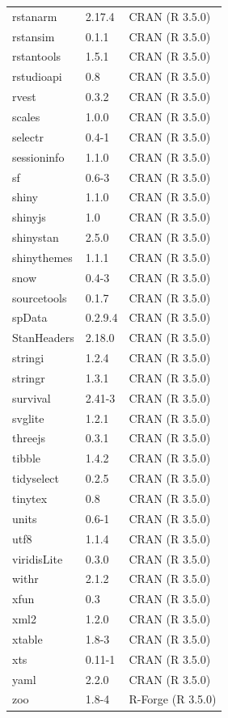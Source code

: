 \documentclass[12pt,a4paper,UTF8,twoside]{book}
\theoremstyle{definition}
\theoremstyle{definition}
\theoremstyle{definition}
\theoremstyle{remark}
\begin{document}
\begin{longtable}[]{@{}lll@{}}
rstanarm & 2.17.4 & CRAN (R 3.5.0)\tabularnewline
rstansim & 0.1.1 & CRAN (R 3.5.0)\tabularnewline
rstantools & 1.5.1 & CRAN (R 3.5.0)\tabularnewline
rstudioapi & 0.8 & CRAN (R 3.5.0)\tabularnewline
rvest & 0.3.2 & CRAN (R 3.5.0)\tabularnewline
scales & 1.0.0 & CRAN (R 3.5.0)\tabularnewline
selectr & 0.4-1 & CRAN (R 3.5.0)\tabularnewline
sessioninfo & 1.1.0 & CRAN (R 3.5.0)\tabularnewline
sf & 0.6-3 & CRAN (R 3.5.0)\tabularnewline
shiny & 1.1.0 & CRAN (R 3.5.0)\tabularnewline
shinyjs & 1.0 & CRAN (R 3.5.0)\tabularnewline
shinystan & 2.5.0 & CRAN (R 3.5.0)\tabularnewline
shinythemes & 1.1.1 & CRAN (R 3.5.0)\tabularnewline
snow & 0.4-3 & CRAN (R 3.5.0)\tabularnewline
sourcetools & 0.1.7 & CRAN (R 3.5.0)\tabularnewline
spData & 0.2.9.4 & CRAN (R 3.5.0)\tabularnewline
StanHeaders & 2.18.0 & CRAN (R 3.5.0)\tabularnewline
stringi & 1.2.4 & CRAN (R 3.5.0)\tabularnewline
stringr & 1.3.1 & CRAN (R 3.5.0)\tabularnewline
survival & 2.41-3 & CRAN (R 3.5.0)\tabularnewline
svglite & 1.2.1 & CRAN (R 3.5.0)\tabularnewline
threejs & 0.3.1 & CRAN (R 3.5.0)\tabularnewline
tibble & 1.4.2 & CRAN (R 3.5.0)\tabularnewline
tidyselect & 0.2.5 & CRAN (R 3.5.0)\tabularnewline
tinytex & 0.8 & CRAN (R 3.5.0)\tabularnewline
units & 0.6-1 & CRAN (R 3.5.0)\tabularnewline
utf8 & 1.1.4 & CRAN (R 3.5.0)\tabularnewline
viridisLite & 0.3.0 & CRAN (R 3.5.0)\tabularnewline
withr & 2.1.2 & CRAN (R 3.5.0)\tabularnewline
xfun & 0.3 & CRAN (R 3.5.0)\tabularnewline
xml2 & 1.2.0 & CRAN (R 3.5.0)\tabularnewline
xtable & 1.8-3 & CRAN (R 3.5.0)\tabularnewline
xts & 0.11-1 & CRAN (R 3.5.0)\tabularnewline
yaml & 2.2.0 & CRAN (R 3.5.0)\tabularnewline
zoo & 1.8-4 & R-Forge (R 3.5.0)\tabularnewline
\bottomrule
\end{longtable}


\backmatter
\end{document}

